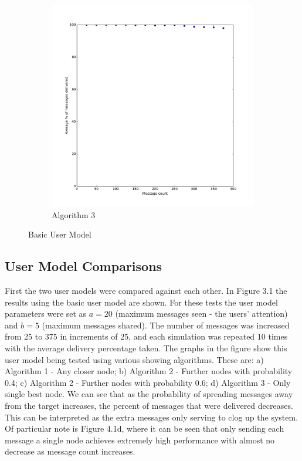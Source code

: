 \documentclass[bsc,frontabs,twoside,singlespacing,parskip,deptreport]{infthesis}     %
\begin{document}
\begin{figure}
\begin{subfigure}[b]{0.3\textwidth}
        \includegraphics[width=\textwidth]{results/BasicShare_OnlyBest}
        \caption{Algorithm 3}
        \label{fig:results/BasicShare_OnlyBest}
    \end{subfigure}
  	\vspace{-5pt}
    \caption{Basic User Model}\label{fig:BasicUserModel}
  	\vspace{-15pt}
\end{figure}

\subsection{User Model Comparisons}
First the two user models were compared against each other. In Figure 3.1 the results using the basic user model are shown. For these tests the user model parameters were set as $a = 20$ (maximum messages seen - the users' attention) and $b = 5$ (maximum messages shared). The number of messages was increased from 25 to 375 in increments of 25, and each simulation was repeated 10 times with the average delivery percentage taken. The graphs in the figure show this user model being tested using various showing algorithms. These are: a) Algorithm 1 - Any closer node; b) Algorithm 2 - Further nodes with probability 0.4; c) Algorithm 2 - Further nodes with probability 0.6; d) Algorithm 3 - Only single best node. We can see that as the probability of spreading messages away from the target increases, the percent of messages that were delivered decreases. This can be interpreted as the extra messages only serving to clog up the system. Of particular note is Figure 4.1d, where it can be seen that only sending each message a single node achieves extremely high performance with almost no decrease as message count increases.
\end{document}
